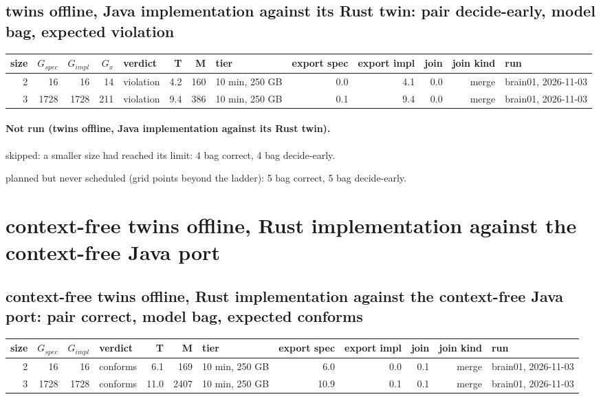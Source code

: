 \documentclass[10pt]{article}
\begin{document}
\subsection*{twins offline, Java implementation against its Rust twin: pair \textsf{decide-early}, model bag, expected violation}
\begin{longtable}{@{}rrrrlrrlrrrrl@{}}
\toprule
size & $G_{\mathit{spec}}$ & $G_{\mathit{impl}}$ & $G_x$ & verdict & T & M & tier & export spec & export impl & join & join kind & run \\
\midrule
\endhead
\color{blue} 2 & 16 & 16 & 14 & violation & 4.2 & 160 & 10 min, 250 GB & 0.0 & 4.1 & 0.0 & merge & brain01, 2026-11-03 \\
\color{blue} 3 & 1728 & 1728 & 211 & violation & 9.4 & 386 & 10 min, 250 GB & 0.1 & 9.4 & 0.0 & merge & brain01, 2026-11-03 \\
\bottomrule
\end{longtable}
\paragraph{Not run (twins offline, Java implementation against its Rust twin).}
skipped: a smaller size had reached its limit: 4 bag correct, 4 bag decide-early.\par
planned but never scheduled (grid points beyond the ladder): 5 bag correct, 5 bag decide-early.\par
\section*{context-free twins offline, Rust implementation against the context-free Java port}
\subsection*{context-free twins offline, Rust implementation against the context-free Java port: pair \textsf{correct}, model bag, expected conforms}
\begin{longtable}{@{}rrrlrrlrrrrl@{}}
\toprule
size & $G_{\mathit{spec}}$ & $G_{\mathit{impl}}$ & verdict & T & M & tier & export spec & export impl & join & join kind & run \\
\midrule
\endhead
\color{blue} 2 & 16 & 16 & conforms & 6.1 & 169 & 10 min, 250 GB & 6.0 & 0.0 & 0.1 & merge & brain01, 2026-11-03 \\
\color{blue} 3 & 1728 & 1728 & conforms & 11.0 & 2407 & 10 min, 250 GB & 10.9 & 0.1 & 0.1 & merge & brain01, 2026-11-03 \\
\bottomrule
\end{longtable}
\end{document}
